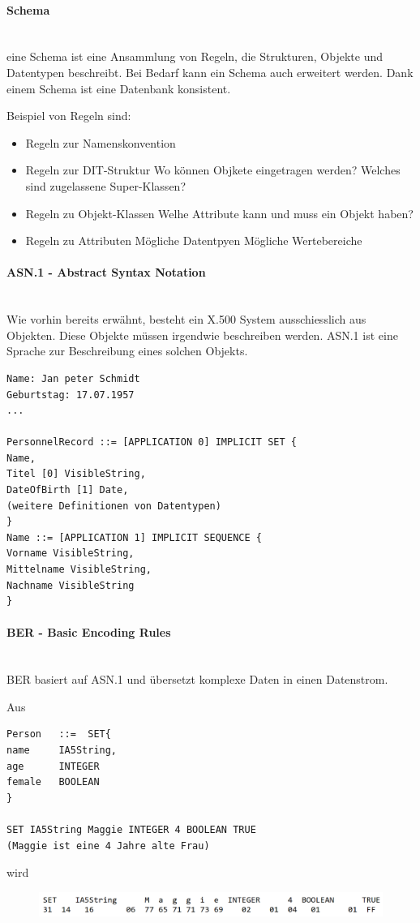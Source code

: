 \documentclass[a4paper, 11pt]{article}
\begin{document}
\paragraph{Schema}\mbox{}\\
eine Schema ist eine Ansammlung von Regeln, die Strukturen, Objekte und Datentypen beschreibt. Bei Bedarf kann ein Schema auch erweitert werden. Dank einem Schema ist eine Datenbank konsistent. 

Beispiel von Regeln sind:
\begin{itemize}
	\item Regeln zur Namenskonvention
	\item Regeln zur DIT-Struktur
	\subitem Wo können Objkete eingetragen werden?
	\subitem Welches sind zugelassene Super-Klassen?
	\item Regeln zu Objekt-Klassen
	\subitem Welhe Attribute kann und muss ein Objekt haben?
	\item Regeln zu Attributen
	\subitem Mögliche Datentpyen
	\subitem Mögliche Wertebereiche
\end{itemize}

\paragraph{ASN.1 - Abstract Syntax Notation}\mbox{}\\
Wie vorhin bereits erwähnt, besteht ein X.500 System ausschiesslich aus Objekten. Diese Objekte müssen irgendwie beschreiben werden. ASN.1 ist eine Sprache zur Beschreibung eines solchen Objekts.

\begin{lstlisting}
Name: Jan peter Schmidt
Geburtstag: 17.07.1957
...

PersonnelRecord ::= [APPLICATION 0] IMPLICIT SET {
Name, 
Titel [0] VisibleString, 
DateOfBirth [1] Date, 
(weitere Definitionen von Datentypen) 
} 
Name ::= [APPLICATION 1] IMPLICIT SEQUENCE {
Vorname VisibleString, 
Mittelname VisibleString, 
Nachname VisibleString 
} 
\end{lstlisting}

\paragraph{BER - Basic Encoding Rules}\mbox{}\\
BER basiert auf ASN.1 und übersetzt komplexe Daten in einen Datenstrom.

Aus
\begin{lstlisting}
Person   ::=  SET{
name     IA5String,
age      INTEGER
female   BOOLEAN
}

SET IA5String Maggie INTEGER 4 BOOLEAN TRUE
(Maggie ist eine 4 Jahre alte Frau)
\end{lstlisting}
wird
\begin{figure}[htb]
	\centering
	\includegraphics[keepaspectratio=true,height=2.5\baselineskip]{maggie.PNG}
\end{figure}
\end{document}
